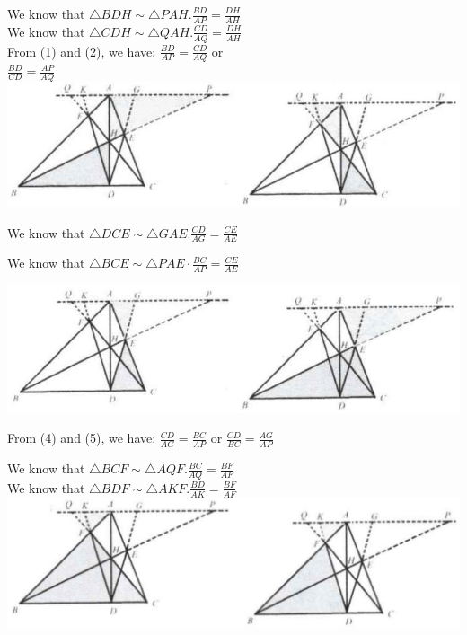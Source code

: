 \documentclass[10pt]{article}
\begin{document}
We know that \(\triangle B D H \sim \triangle P A H . \frac{B D}{A P}=\frac{D H}{A H}\)\\
We know that \(\triangle C D H \sim \triangle Q A H . \frac{C D}{A Q}=\frac{D H}{A H}\)\\
From (1) and (2), we have: \(\frac{B D}{A P}=\frac{C D}{A Q}\) or\\
\(\frac{B D}{C D}=\frac{A P}{A Q}\)\\
\includegraphics[max width=\textwidth, center]{2025_04_17_97bc1f7e44d93c271a88g-124(3)}

We know that \(\triangle D C E \sim \triangle G A E . \frac{C D}{A G}=\frac{C E}{A E}\)

We know that \(\triangle B C E \sim \triangle P A E \cdot \frac{B C}{A P}=\frac{C E}{A E}\)


\begin{center}
\includegraphics[max width=\textwidth]{2025_04_17_97bc1f7e44d93c271a88g-125(1)}
\end{center}

From (4) and (5), we have: \(\frac{C D}{A G}=\frac{B C}{A P}\) or \(\frac{C D}{B C}=\frac{A G}{A P}\)

We know that \(\triangle B C F \sim \triangle A Q F . \frac{B C}{A Q}=\frac{B F}{A F}\)\\
We know that \(\triangle B D F \sim \triangle A K F . \frac{B D}{A K}=\frac{B F}{A F}\)\\
\includegraphics[max width=\textwidth, center]{2025_04_17_97bc1f7e44d93c271a88g-125}
\end{document}
